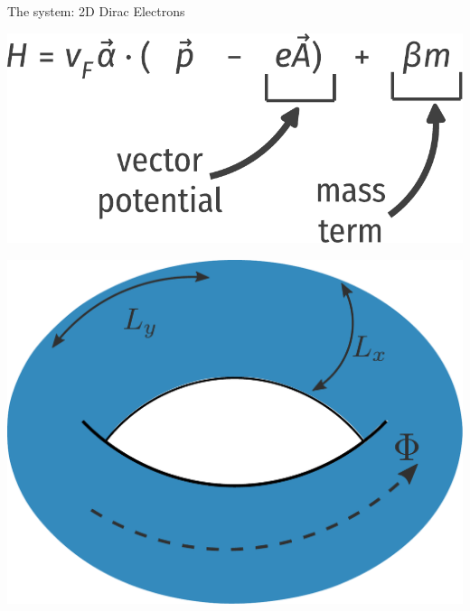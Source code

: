 \documentclass[12pt,aspectratio=169]{beamer}
\begin{document}
\begin{frame}{The system: 2D Dirac Electrons}
{\begin{minipage}{0.4\textwidth}
\includegraphics[width=\textwidth]{figures/diracHamiltonian.pdf}
\end{minipage}
\hspace*{\fill}
\begin{minipage}{0.4\textwidth}
\includegraphics[width=\textwidth]{figures/torus.pdf}
\end{minipage}
}
\end{frame}
\end{document}
